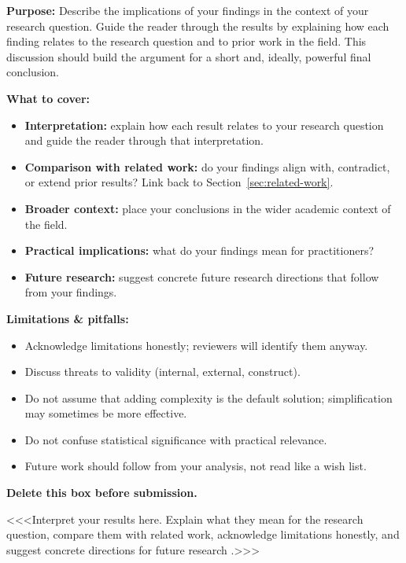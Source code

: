 \documentclass[12pt,a4paper,twocolumn]{article}
\begin{document}
\begin{guidancebox}
\textbf{Purpose:} Describe the implications of your findings in the
context of your research question. Guide the reader through the results by
explaining how each finding relates to the research question and to prior
work in the field. This discussion should build the argument for a short
and, ideally, powerful final conclusion.

\textbf{What to cover:}
\begin{itemize}[leftmargin=*, nosep]
  \item \textbf{Interpretation:} explain how each result relates to your
    research question and guide the reader through that interpretation.
  \item \textbf{Comparison with related work:} do your findings align with,
    contradict, or extend prior results? Link back to
    Section~\ref{sec:related-work}.
  \item \textbf{Broader context:} place your conclusions in the wider
    academic context of the field.
  \item \textbf{Practical implications:} what do your findings mean for
    practitioners?
  \item \textbf{Future research:} suggest concrete future research
    directions that follow from your findings.
\end{itemize}

\textbf{Limitations \& pitfalls:}
\begin{itemize}[leftmargin=*, nosep]
  \item Acknowledge limitations honestly; reviewers will identify them anyway.
  \item Discuss threats to validity (internal, external, construct).
  \item Do not assume that adding complexity is the default solution;
    simplification may sometimes be more effective.
  \item Do not confuse statistical significance with practical relevance.
  \item Future work should follow from your analysis, not read like a wish list.
\end{itemize}

\textbf{Delete this box before submission.}
\end{guidancebox}

\noindent
<<<Interpret your results here. Explain what they mean for the research
question, compare them with related work, acknowledge limitations honestly,
and suggest concrete directions for future research \cite{vaswani2017}.>>>
\end{document}
